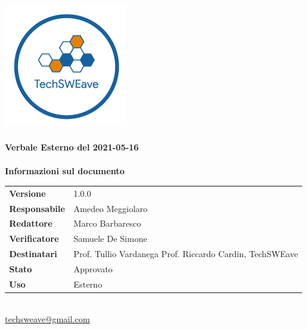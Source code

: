 \documentclass[a4paper]{article}
\begin{document}
\begin{titlepage}
    \begin{center}
        \includegraphics{../../../../Images/logo.png}\\
        \vspace{20px}
        \textcolor{logo}{\hrulefill}\\
        \vspace{20px}
        \textbf{\huge\textcolor{logo}{Verbale Esterno del 2021-05-16}}\\
        \vspace{10px}
        \textcolor{logo}{\hrulefill}\\
        \vspace{40px}
        \textbf{\Large Informazioni sul documento}\\
        \vspace{20px}
        \begin{tabular}{p{100px} | p{100px}}
            \textbf{Versione}     & 1.0.0                                                                      \\
            \textbf{Responsabile} & Amedeo Meggiolaro                                                          \\
            \textbf{Redattore}    & Marco Barbaresco                                                           \\
            \textbf{Verificatore} & Samuele De Simone                                                          \\
            \textbf{Destinatari}  & Prof. Tullio Vardanega \newline Prof. Riccardo Cardin, \newline TechSWEave \\
            \textbf{Stato}        & Approvato                                                                  \\
            \textbf{Uso}          & Esterno                                                                    \\
        \end{tabular}\\
        \vspace{60px}
        \href{mailto:techsweave@gmail.com}{techsweave@gmail.com}\\

    \end{center}
\end{titlepage}
\end{document}
